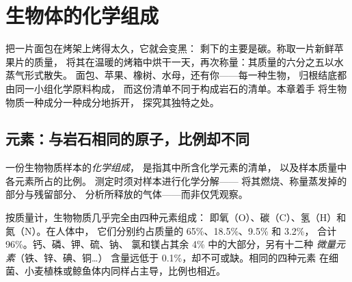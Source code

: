 \chapter{生物体的化学组成}\label{ch:g10:chemistry-of-life}

把一片面包在烤架上烤得太久，它就会变黑：
剩下的主要是碳。称取一片新鲜苹果片的质量，
将其在温暖的烤箱中烘干一天，再次称量：其质量的六分之五以水蒸气形式散失。
面包、苹果、橡树、水母，还有你——每一种生物，
归根结底都由同一小组化学原料构成，
而这份清单不同于构成岩石的清单。本章着手
将生物物质一种成分一种成分地拆开，
探究其独特之处。

\section{元素：与岩石相同的原子，比例却不同}

\begin{definition}[生物物质的化学组成]\label{def:g10:chemistry-of-life:composition}
一份生物物质样本的\emph{化学组成}，
是指其中所含化学元素的清单，
以及样本质量中各元素所占的比例。
测定时须对样本进行化学分解——
将其燃烧、称量蒸发掉的部分与残留部分、
分析所释放的气体——而非仅凭观察。
\end{definition}

\begin{proposition}[四种元素占生物体的96\%]\label{prop:g10:chemistry-of-life:four}
按质量计，生物物质几乎完全由四种元素组成：
即氧（O）、碳（C）、氢（H）和氮（N）。在人体中，
它们分别约占质量的 65\%、18.5\%、9.5\% 和 3.2\%，
合计 96\%。钙、磷、钾、硫、钠、
氯和镁占其余 4\% 中的大部分，另有十二种
\emph{微量元素}（铁、锌、碘、铜\dots）
含量远低于 0.1\%，却不可或缺。相同的四种元素
在细菌、小麦植株或鲸鱼体内同样占主导，比例也相近。
\end{proposition}
\admitted

